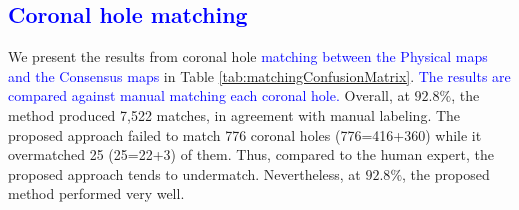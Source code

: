 \documentclass[journal]{IEEEtran}
\begin{document}
\subsection{\textcolor{blue}{Coronal hole matching}}\label{sec:detection}
We present the results from coronal hole 
     \textcolor{blue}{matching between the Physical maps and the Consensus maps}
     in Table \ref{tab:matchingConfusionMatrix}.
\textcolor{blue}{The results are compared against manual matching each coronal hole.}     
Overall, at $92.8\%$, the method produced 7,522 matches,
   in agreement with manual labeling.
The proposed approach failed to match 776 coronal holes
    (776=416+360) while it overmatched 25 (25=22+3) of them.
Thus, compared to the human expert,
    the proposed approach tends to undermatch.       
Nevertheless, at $92.8\%$, the proposed method performed
    very well.    
\end{document}
